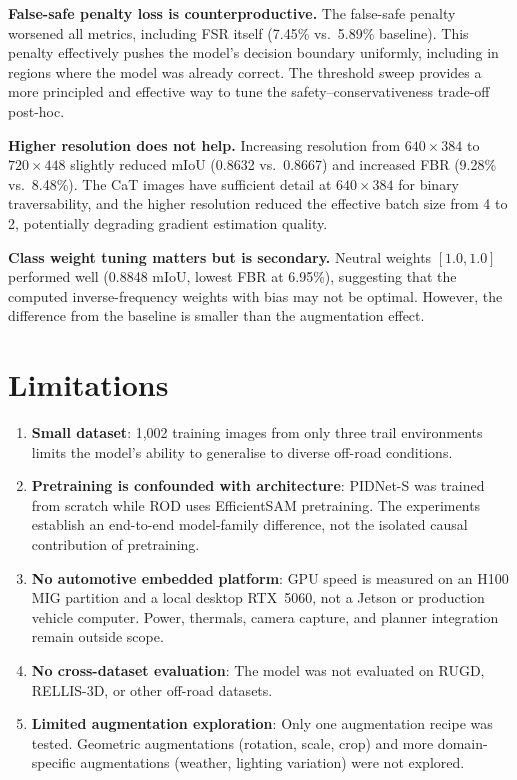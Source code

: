 \documentclass[12pt,a4paper]{report}
\begin{document}
\textbf{False-safe penalty loss is counterproductive.}
The false-safe penalty worsened all metrics, including FSR itself (7.45\% vs.\ 5.89\% baseline).
This penalty effectively pushes the model's decision boundary uniformly, including in regions where the model was already correct.
The threshold sweep provides a more principled and effective way to tune the safety--conservativeness trade-off post-hoc.

\textbf{Higher resolution does not help.}
Increasing resolution from $640\times384$ to $720\times448$ slightly reduced mIoU (0.8632 vs.\ 0.8667) and increased FBR (9.28\% vs.\ 8.48\%).
The CaT images have sufficient detail at $640\times384$ for binary traversability, and the higher resolution reduced the effective batch size from 4 to 2, potentially degrading gradient estimation quality.

\textbf{Class weight tuning matters but is secondary.}
Neutral weights $[1.0, 1.0]$ performed well (0.8848 mIoU, lowest FBR at 6.95\%), suggesting that the computed inverse-frequency weights with bias may not be optimal.
However, the difference from the baseline is smaller than the augmentation effect.

\section{Limitations}

\begin{enumerate}[nosep]
  \item \textbf{Small dataset}: 1{,}002 training images from only three trail environments limits the model's ability to generalise to diverse off-road conditions.
  \item \textbf{Pretraining is confounded with architecture}: PIDNet-S was
  trained from scratch while ROD uses EfficientSAM pretraining. The experiments
  establish an end-to-end model-family difference, not the isolated causal
  contribution of pretraining.
  \item \textbf{No automotive embedded platform}: GPU speed is measured on an
  H100 MIG partition and a local desktop RTX~5060, not a Jetson or production
  vehicle computer. Power, thermals, camera capture, and planner integration
  remain outside scope.
  \item \textbf{No cross-dataset evaluation}: The model was not evaluated on RUGD, RELLIS-3D, or other off-road datasets.
  \item \textbf{Limited augmentation exploration}: Only one augmentation recipe was tested. Geometric augmentations (rotation, scale, crop) and more domain-specific augmentations (weather, lighting variation) were not explored.
\end{enumerate}
\end{document}

